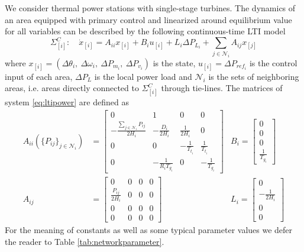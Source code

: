 \documentclass[a4paper]{article}
\newcommand{\NN}{{\mathcal N}}
\newcommand{\subss}[2]{#1_{[#2]}}
\newcommand{\matr}[1]{
\begin{bmatrix}
    #1
\end{bmatrix}
}
\begin{document}
          We consider thermal power stations with single-stage turbines. The dynamics of an area equipped with primary control and linearized around equilibrium value for all variables can be described by the following continuous-time LTI model \cite{Saadat2002}
          \begin{equation}
            \label{eq:ltipower}
            \subss{\Sigma}{i}^C:\quad\subss{\dot{x}}{i} = A_{ii}\subss x i + B_{i}\subss u i + L_{i}\Delta P_{L_i} + \sum_{j\in\NN_i}A_{ij}\subss x j
          \end{equation}
          where $\subss x i=(\Delta\theta_i,~\Delta\omega_i,~\Delta P_{m_i},~\Delta P_{v_i})$ is the state, $\subss u i = \Delta P_{ref_i}$ is the control input of each area, $\Delta P_{L}$ is the local power load and $\NN_i$ is the sets of neighboring areas, i.e. areas directly connected to $\subss\Sigma i^C$ through tie-lines. The matrices of system \eqref{eq:ltipower} are defined as
          \begin{equation}
            \label{eq:matrixpower}
            \begin{aligned}
              A_{ii}(\{P_{ij}\}_{j\in\NN_i}) &= \matr{ 0 & 1 & 0 & 0 \\ -\frac{\sum_{j\in\NN_i}{P_{ij}} }{2H_i} & -\frac{D_i}{2H_i} & \frac{1}{2H_i} & 0 \\ 0 & 0 & -\frac{1}{T_{t_i}}  & \frac{1}{T_{t_i}} \\ 0 & -\frac{1}{R_iT_{g_i}} & 0 & -\frac{1}{T_{g_i}} }
              &B_{i} = \matr{ 0 \\ 0 \\ 0 \\ \frac{1}{T_{g_i}} }\\
              A_{ij} &= \matr{ 0 & 0 & 0 & 0 \\ \frac{P_{ij}}{2H_i} & 0 & 0 & 0 \\ 0 & 0 & 0  & 0 \\ 0 & 0 & 0 & 0 }
              &L_{i} = \matr{ 0 \\ -\frac{1}{2H_i} \\ 0 \\ 0 }
            \end{aligned}
          \end{equation}
          For the meaning of constants as well as some typical parameter values we defer the reader to Table \ref{tab:networkparameter}.
\end{document}
